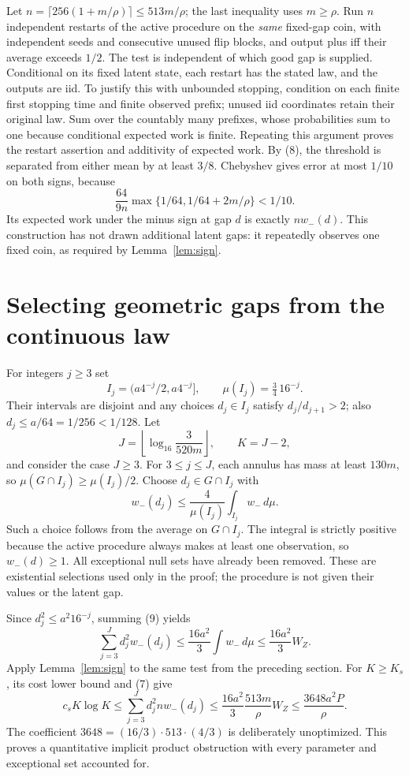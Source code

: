 \documentclass[11pt]{article}
\begin{document}
Let $n=\lceil256(1+m/\rho)\rceil\le513m/\rho$; the last inequality uses
$m\ge\rho$. Run $n$ independent restarts of the active procedure on the
\emph{same} fixed-gap coin, with independent seeds and consecutive unused flip
blocks, and output plus iff their average exceeds $1/2$.
The test is independent of which good gap is supplied. Conditional on its
fixed latent state, each restart has the stated law, and the outputs are iid.
To justify this with unbounded stopping, condition on each finite first stopping
time and finite observed prefix; unused iid coordinates retain their original
law. Sum over the countably many prefixes, whose probabilities sum to one
because conditional expected work is finite. Repeating this argument proves
the restart assertion and additivity of expected work.
By (8), the threshold is separated from either mean by at least $3/8$.
Chebyshev gives error at most $1/10$ on both signs, because
\[
 \frac{64}{9n}\max\{1/64,1/64+2m/\rho\}<1/10.
\]
Its expected work under the minus sign at gap $d$ is exactly $nw_-(d)$.
This construction has not drawn additional latent gaps: it repeatedly observes
one fixed coin, as required by Lemma~\ref{lem:sign}.

\section{Selecting geometric gaps from the continuous law}
For integers $j\ge3$ set
\[
 I_j=(a4^{-j}/2,a4^{-j}],\qquad \mu(I_j)=\tfrac34\,16^{-j}.
\]
Their intervals are disjoint and any choices $d_j\in I_j$ satisfy
$d_j/d_{j+1}>2$; also $d_j\le a/64=1/256<1/128$.
Let
\[
 J=\left\lfloor\log_{16}\frac{3}{520m}\right\rfloor,
 \qquad K=J-2,
\]
and consider the case $J\ge3$. For $3\le j\le J$, each annulus has mass
at least $130m$, so $\mu(G\cap I_j)\ge\mu(I_j)/2$.
Choose $d_j\in G\cap I_j$ with
\[
 w_-(d_j)\le\frac4{\mu(I_j)}\int_{I_j}w_-\,d\mu.       \tag{9}
\]
Such a choice follows from the average on $G\cap I_j$. The integral is strictly
positive because the active procedure always makes at least one observation,
so $w_-(d)\ge1$. All exceptional null sets have already been removed.
These are existential selections used only in the proof; the procedure is not
given their values or the latent gap.

Since $d_j^2\le a^2 16^{-j}$, summing (9) yields
\[
 \sum_{j=3}^Jd_j^2 w_-(d_j)
 \le\frac{16a^2}{3}\int w_-\,d\mu
 \le\frac{16a^2}{3}W_Z.
\]
Apply Lemma~\ref{lem:sign} to the same test from the preceding section.
For $K\ge K_s$, its cost lower bound and (7) give
\[
 c_sK\log K
 \le\sum_{j=3}^Jd_j^2 nw_-(d_j)
 \le\frac{16a^2}{3}\frac{513m}{\rho}W_Z
 \le\frac{3648a^2P}{\rho}.                              \tag{10}
\]
The coefficient $3648=(16/3)\cdot513\cdot(4/3)$ is deliberately unoptimized.
This proves a quantitative implicit product obstruction with every parameter
and exceptional set accounted for.
\end{document}
